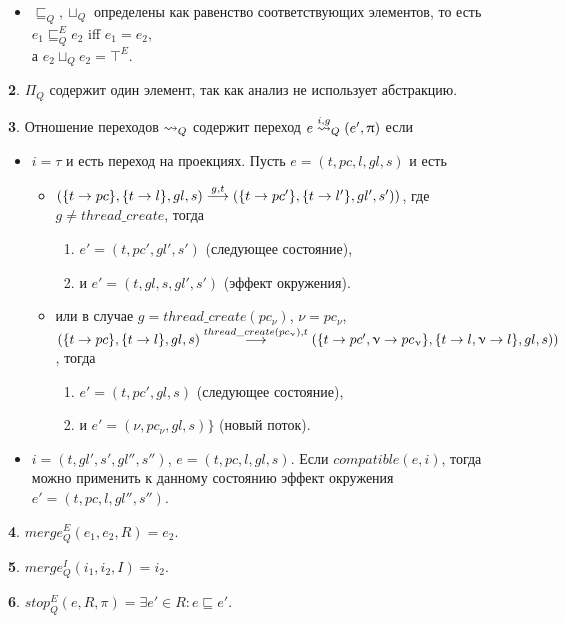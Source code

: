 \begin{itemize}
\item $\sqsubseteq_Q, \sqcup_Q$ определены как равенство соответствующих элементов, то есть\\
$e_1 \sqsubseteq^E_Q e_2$ iff $e_1 = e_2$, \\
а $e_2 \sqcup_Q e_2 = \top^E$.

\end{itemize}

{\textbf 2.} $\Pi_Q$ содержит один элемент, так как анализ не использует абстракцию.

{\textbf 3.}
Отношение переходов $\leadsto_Q$ содержит переход $e \stackrel{i,g}{\leadsto}_Q (e', \uppi)$ если
\begin{itemize}
\item $i=\tau$ и есть переход на проекциях. Пусть
$e=(t, pc, l, gl, s)$ и есть
\begin{itemize}
\item $(\{t\to pc\}, \{t\to l\}, gl, s) \stackrel{g,t}{\longrightarrow} (\{t\to pc'\}, \{t\to l'\}, gl', s'))$, где $g \ne thread\_create$, тогда \\
\begin{enumerate}
\item $e' = (t,pc',gl',s')$ (следующее состояние), 
\item и $e'=(t,gl,s,gl',s')$ (эффект окружения).
\end{enumerate}
\item или в случае $g=thread\_create(pc_\nu)$, $\nu=pc_\nu$, \\
$(\{t\to pc\}, \{t\to l\}, gl, s) \stackrel{thread\_create(pc_\upnu), t}{\longrightarrow} (\{t\to pc', \upnu \to pc_\upnu\}, \{t\to l,\upnu \to l\}, gl, s))$, тогда \\
\begin{enumerate}
\item $e' = (t,pc',gl,s)$ (следующее состояние),
\item и $e' = (\nu,pc_\nu,gl,s)\}$ (новый поток).
\end{enumerate}
\end{itemize}
\item $i=(t, gl',s',gl'',s'')$, $e=(t, pc, l, gl, s)$. Если $compatible(e,i)$, тогда можно применить к данному состоянию эффект окружения $e'=(t, pc, l, gl'', s'')$.
\end{itemize}

{\textbf 4.}
$merge^E_Q(e_1,e_2,R) = e_2$.

{\textbf 5.}
$merge^I_Q(i_1,i_2,I) = i_2$.

{\textbf 6.}
$stop^E_Q(e,R,\pi)=\exists e' \in R: e \sqsubseteq e'$.

